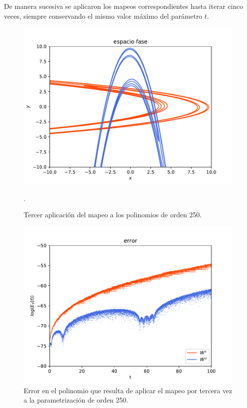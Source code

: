 De manera sucesiva se aplicaron los mapeos correspondientes hasta iterar cinco veces, siempre conservando el mismo valor máximo del parámetro $t$.
\begin{figure}[h!]
\centering
\includegraphics[scale=0.7]{rectangulo3.pdf}
\caption{Tercer aplicación del mapeo a los polinomios de orden 250.}.
\label{Rectangulo3}
\end{figure}

\begin{figure}[h!]
\centering
\includegraphics[scale=0.7]{error3ite.pdf}
\caption{Error en el polinomio que resulta de aplicar el mapeo por tercera vez a la parametrización de orden 250.}
\label{error-3iteracion}
\end{figure}

